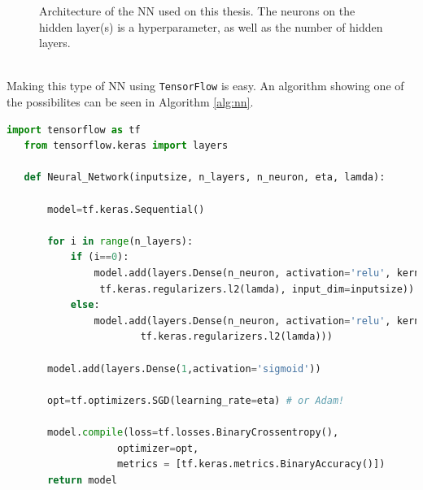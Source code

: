 \documentclass[12pt, a4paper]{book}
\begin{document}
\begin{figure}[!ht]
   \caption[Neural Network Architecture]{Architecture of the NN used on this thesis. 
   The neurons on the hidden layer(s) is a hyperparameter, as well as the number of hidden layers. }\label{fig:NNArch}
\end{figure}
\\Making this type of NN using \verb|TensorFlow| is easy. An algorithm showing one of the possibilites can be seen in Algorithm \ref{alg:nn}.
\begin{lstlisting}[basicstyle=\tiny, language=Python, caption={Neural network definition using TensorFlow}, label=alg:nn, captionpos=t]
   import tensorflow as tf
   from tensorflow.keras import layers
   
   def Neural_Network(inputsize, n_layers, n_neuron, eta, lamda):
       
       model=tf.keras.Sequential()      
       
       for i in range(n_layers):       
           if (i==0):                  
               model.add(layers.Dense(n_neuron, activation='relu', kernel_regularizer=
                tf.keras.regularizers.l2(lamda), input_dim=inputsize))
           else:                       
               model.add(layers.Dense(n_neuron, activation='relu', kernel_regularizer=
                       tf.keras.regularizers.l2(lamda)))
                       
       model.add(layers.Dense(1,activation='sigmoid')) 
       
       opt=tf.optimizers.SGD(learning_rate=eta) # or Adam!
       
       model.compile(loss=tf.losses.BinaryCrossentropy(),
                   optimizer=opt,
                   metrics = [tf.keras.metrics.BinaryAccuracy()])
       return model
   \end{lstlisting}
\end{document}
